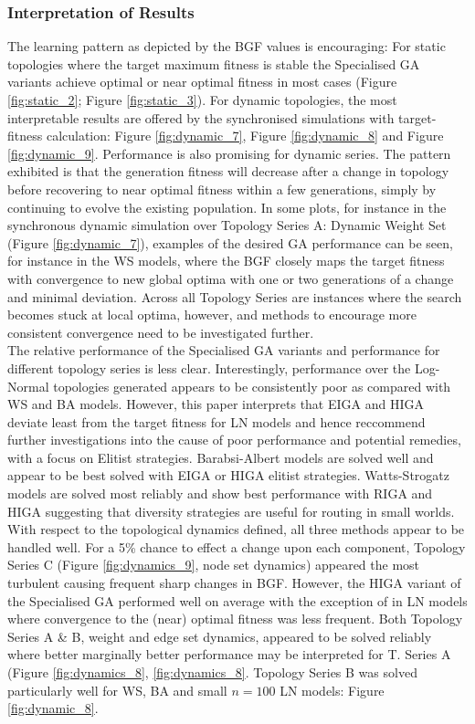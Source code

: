 \documentclass[
	a4paper, %
	10pt, %
	unnumberedsections, %
	twoside, %
]{LTJournalArticle}
\begin{document}
\subsubsection{Interpretation of Results} The learning pattern as depicted by the BGF values is encouraging: For static topologies where the target maximum fitness is stable the Specialised GA variants achieve optimal or near optimal fitness in most cases (Figure \ref{fig:static_2}; Figure \ref{fig:static_3}). For dynamic topologies, the most interpretable results are offered by the synchronised simulations with target-fitness calculation: Figure \ref{fig:dynamic_7}, Figure \ref{fig:dynamic_8} and Figure \ref{fig:dynamic_9}. Performance is also promising for dynamic series. The pattern exhibited is that the generation fitness will decrease after a change in topology before recovering to near optimal fitness within a few generations, simply by continuing to evolve the existing population. In some plots, for instance in the synchronous dynamic simulation over Topology Series A: Dynamic Weight Set (Figure \ref{fig:dynamic_7}), examples of the desired GA performance can be seen, for instance in the WS models, where the BGF closely maps the target fitness with convergence to new global optima with one or two generations of a change and minimal deviation. Across all Topology Series are instances where the search becomes stuck at local optima, however, and methods to encourage more consistent convergence need to be investigated further. \\

The relative performance of the Specialised GA variants and performance for different topology series is less clear. Interestingly, performance over the Log-Normal topologies generated appears to be consistently poor as compared with WS and BA models. However, this paper interprets that EIGA and HIGA deviate least from the target fitness for LN models and hence reccommend further investigations into the cause of poor performance and potential remedies, with a focus on Elitist strategies. Barabsi-Albert models are solved well and appear to be best solved with EIGA or HIGA elitist strategies. Watts-Strogatz models are solved most reliably and show best performance with RIGA and HIGA suggesting that diversity strategies are useful for routing in small worlds. \\

With respect to the topological dynamics defined, all three methods appear to be handled well. For a 5\% chance to effect a change upon each component, Topology Series C (Figure \ref{fig:dynamics_9}, node set dynamics) appeared the most turbulent causing frequent sharp changes in BGF. However, the HIGA variant of the Specialised GA performed well on average with the exception of in LN models where convergence to the (near) optimal fitness was less frequent. Both Topology Series A \& B, weight and edge set dynamics, appeared to be solved reliably where better marginally better performance may be interpreted for T. Series A (Figure \ref{fig:dynamics_8}, \ref{fig:dynamics_8}. Topology Series B was solved particularly well for WS, BA and small \(n = 100\) LN models: Figure \ref{fig:dynamic_8}. 
\end{document}
